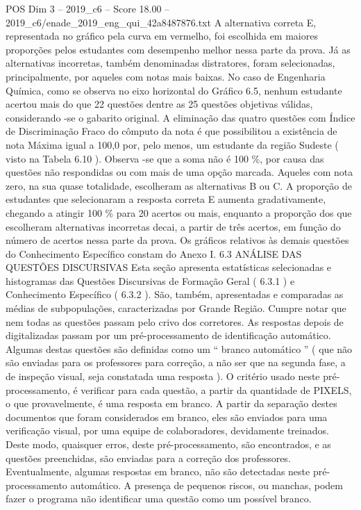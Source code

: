 \begin{textsample}{POS Dim 3 – 2019\_c6 – Score 18.00 – 2019\_c6/enade\_2019\_eng\_qui\_42a8487876.txt}
A alternativa correta E, representada no gráfico pela curva em vermelho, foi escolhida em maiores proporções pelos estudantes com desempenho melhor nessa parte da prova.
Já as alternativas incorretas, também denominadas distratores, foram selecionadas, principalmente, por aqueles com notas mais baixas.
No caso de Engenharia Química, como se observa no eixo horizontal do Gráfico 6.5, nenhum estudante acertou mais do que 22 questões dentre as 25 questões objetivas válidas, considerando -se o gabarito original.
A eliminação das quatro questões com Índice de Discriminação Fraco do cômputo da nota é que possibilitou a existência de nota Máxima igual a 100,0 por, pelo menos, um estudante da região Sudeste ( visto na Tabela 6.10 ).
Observa -se que a soma não é 100 \%, por causa das questões não respondidas ou com mais de uma opção marcada.
Aqueles com nota zero, na sua quase totalidade, escolheram as alternativas B ou C.
A proporção de estudantes que selecionaram a resposta correta E aumenta gradativamente, chegando a atingir 100 \% para 20 acertos ou mais, enquanto a proporção dos que escolheram alternativas incorretas decai, a partir de três acertos, em função do número de acertos nessa parte da prova.
Os gráficos relativos às demais questões do Conhecimento Específico constam do Anexo I. 6.3 ANÁLISE DAS QUESTÕES DISCURSIVAS Esta seção apresenta estatísticas selecionadas e histogramas das Questões Discursivas de Formação Geral ( 6.3.1 ) e Conhecimento Específico ( 6.3.2 ).
São, também, apresentadas e comparadas as médias de subpopulações, caracterizadas por Grande Região.
Cumpre notar que nem todas as questões passam pelo crivo dos corretores.
As respostas depois de digitalizadas passam por um pré-processamento de identificação automático.
Algumas destas questões são definidas como um “ branco automático ” ( que não são enviadas para os professores para correção, a não ser que na segunda fase, a de inspeção visual, seja constatada uma resposta ).
O critério usado neste pré-processamento, é verificar para cada questão, a partir da quantidade de PIXELS, o que provavelmente, é uma resposta em branco.
A partir da separação destes documentos que foram considerados em branco, eles são enviados para uma verificação visual, por uma equipe de colaboradores, devidamente treinados.
Deste modo, quaisquer erros, deste pré-processamento, são encontrados, e as questões preenchidas, são enviadas para a correção dos professores.
Eventualmente, algumas respostas em branco, não são detectadas neste pré-processamento automático.
A presença de pequenos riscos, ou manchas, podem fazer o programa não identificar uma questão como um possível branco.

\end{textsample}

